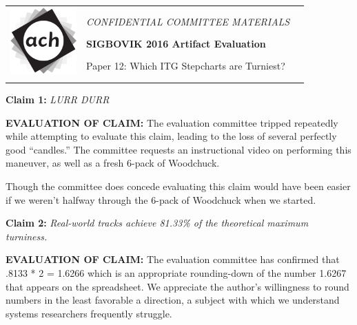 \documentclass[12pt]{article}
\begin{document}
 {\sffamily
 \begin{tabular}{lll}
 \multirow{8}{1in}{\includegraphics[width=1in]{ach.png}} & &\\%
 & &\\
 & \large{\em CONFIDENTIAL COMMITTEE MATERIALS} &\\
 & &\\
 & \textbf{\LARGE{SIGBOVIK 2016 Artifact Evaluation}}& \\
 & &\\
 & \Large{Paper 12: Which ITG Stepcharts are Turniest?} & \\
 &\\
 \vspace{1em}\\
 \hline
 \end{tabular}}
 \vspace{2em}
 \thispagestyle{empty}


\textbf{Claim 1:}  \textit{LURR DURR}

\textbf{EVALUATION OF CLAIM:}
  The evaluation committee tripped repeatedly while attempting to
  evaluate this claim, leading to the loss of several perfectly good ``candles.'' The committee requests
  an instructional video on performing this maneuver, as well as a fresh 6-pack of Woodchuck.

  Though the committee does concede evaluating this claim would have been easier if we weren’t
  halfway through the 6-pack of Woodchuck when we started.

\textbf{Claim 2:}  \textit{Real-world tracks achieve 81.33\% of the theoretical maximum turniness.}

\textbf{EVALUATION OF CLAIM:}
  The evaluation committee has confirmed that .8133 * 2 = 1.6266 which is an
  appropriate rounding-down of the number 1.6267 that appears on the spreadsheet. We appreciate
  the author's willingness to round numbers in the least favorable a direction, a subject with which
  we understand systems researchers frequently struggle.
\end{document}
